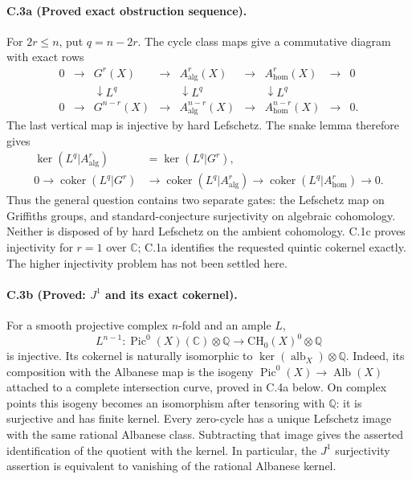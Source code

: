 \paragraph{C.3a (Proved exact obstruction sequence).}
For $2r\le n$, put $q=n-2r$. The cycle class maps give a commutative
diagram with exact rows
\[
\begin{array}{ccccccccc}
0&\to&G^r(X)&\to&A^r_{\mathrm{alg}}(X)&\to&A^r_{\mathrm{hom}}(X)&\to&0\\
 &&\downarrow L^q&&\downarrow L^q&&\downarrow L^q\\
0&\to&G^{n-r}(X)&\to&A^{n-r}_{\mathrm{alg}}(X)&\to&A^{n-r}_{\mathrm{hom}}(X)&\to&0.
\end{array}
\]
The last vertical map is injective by hard Lefschetz. The snake lemma
therefore gives
\[
\begin{split}
\ker(L^q|A^r_{\mathrm{alg}})&=\ker(L^q|G^r),\\
0\longrightarrow\operatorname{coker}(L^q|G^r)&\longrightarrow
\operatorname{coker}(L^q|A^r_{\mathrm{alg}})
\longrightarrow\operatorname{coker}(L^q|A^r_{\mathrm{hom}})
\longrightarrow0.
\end{split}
\]
Thus the general question contains two separate gates: the Lefschetz
map on Griffiths groups, and standard-conjecture surjectivity on
algebraic cohomology. Neither is disposed of by hard Lefschetz on the
ambient cohomology. C.1c proves injectivity for $r=1$ over $\mathbb C$;
C.1a identifies the requested quintic cokernel exactly. The higher
injectivity problem has not been settled here.

\paragraph{C.3b (Proved: $J^1$ and its exact cokernel).}
For a smooth projective complex $n$-fold and an ample $L$,
\[
 L^{n-1}:\operatorname{Pic}^0(X)(\mathbb C)\otimes\mathbb Q
 \longrightarrow\mathrm{CH}_0(X)^0\otimes\mathbb Q
\]
is injective. Its cokernel is naturally isomorphic to
$\ker(\operatorname{alb}_X)\otimes\mathbb Q$. Indeed, its composition
with the Albanese map is the isogeny
$\operatorname{Pic}^0(X)\to\operatorname{Alb}(X)$ attached to a complete
intersection curve, proved in C.4a below. On complex points this
isogeny becomes an isomorphism after tensoring with $\mathbb Q$:
it is surjective and has finite kernel. Every zero-cycle has a unique
Lefschetz image with the same rational Albanese class. Subtracting that
image gives the asserted identification of the quotient with the kernel.
In particular, the $J^1$ surjectivity assertion is equivalent to
vanishing of the rational Albanese kernel.

